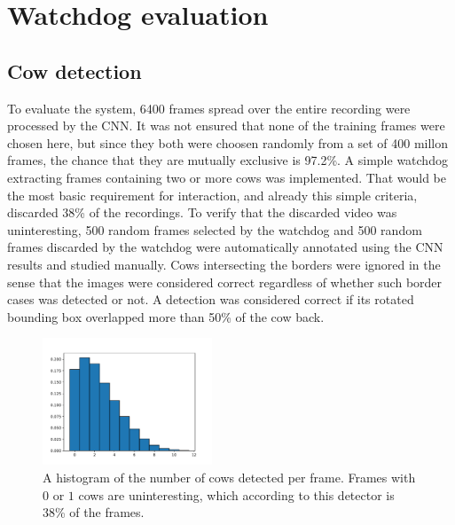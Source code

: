 \documentclass{cta-author}
\begin{document}
\section{Watchdog evaluation}
\subsection{Cow detection}
\label{sec:num}
To evaluate the system, 6400 frames spread over the entire recording were processed by the CNN.
It was not ensured that none of the training frames were chosen here, but since they both were choosen
randomly from a set of 400 millon frames, the chance that they are mutually exclusive is 97.2\%.
A simple watchdog extracting frames containing two or more cows was implemented. That would be the most basic
requirement for interaction, and already this simple criteria, discarded 38\% of the recordings. To
verify that the discarded video was uninteresting, 500 random frames selected by the watchdog and 500 random
frames discarded by the watchdog were automatically annotated using the CNN results and studied manually.
Cows intersecting the borders were ignored in the sense that the images were considered correct regardless of
whether such border cases was detected or not. A detection was considered correct if its rotated bounding
box overlapped more than 50\% of the cow back.

\begin{figure}[tb]
\begin{center}
  \includegraphics[width=0.45\textwidth]{cow_nbr_hist.pdf}
\end{center}
  \caption{A histogram of the number of cows detected per frame. Frames with $0$ or $1$ cows are
uninteresting, which according to this detector is 38\% of the frames.}
  \label{fig:cowhist}
\end{figure}
\end{document}
